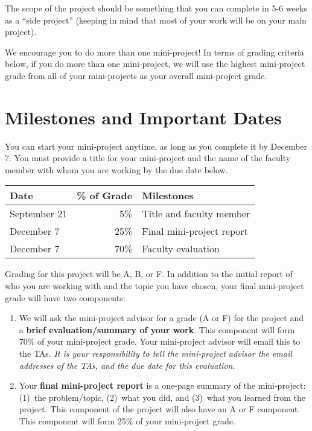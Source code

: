 \documentclass[11pt]{article}
\begin{document}
The scope of the project should be something that you can complete in
5-6 weeks as a ``side project'' (keeping in mind that most of your work
will be on your main project).

We encourage you to do more than one mini-project!  In terms of grading
criteria below, if you do more than one mini-project, we will use the
highest mini-project grade from all of your mini-projects as your
overall mini-project grade.

\section{Milestones and Important Dates}

You can start your mini-project anytime, as long as you complete it by
December 7.   You must provide a title for your mini-project and the
name of the faculty member with whom you are working by the due date
below.

\begin{center}
\begin{tabular}{lrp{3.5in}}
{\bf Date} & {\bf \% of Grade} & {\bf Milestones} \\ \hline
September 21 & 5\% & Title and faculty member \\
December 7 & 25\% & Final mini-project report \\
December 7 & 70\% & Faculty evaluation
\end{tabular}
\end{center}

Grading for this project will be A, B, or F.  In addition to the initial
report of who you are working with and the topic you have chosen, your
final mini-project grade will have two components:

\begin{enumerate}
\itemsep=-1pt
\item We will ask the mini-project advisor for a grade (A or F) for the
  project and a {\bf brief evaluation/summary of your work}. This
  component will form 70\% of your mini-project grade.  Your
  mini-project advisor will email this to the TAs. {\em It is your
  responsibility to tell the mini-project advisor the email addresses of
  the TAs, and the due date for this evaluation.}
%
\item Your {\bf final mini-project report} is a one-page summary of the
  mini-project: (1)~the problem/topic, (2)~what you did, and (3)~what
  you learned from the project.  This component of the project will also
  have an A or F component. This component will form 25\% of your
  mini-project grade.
\end{enumerate}
\end{document}
